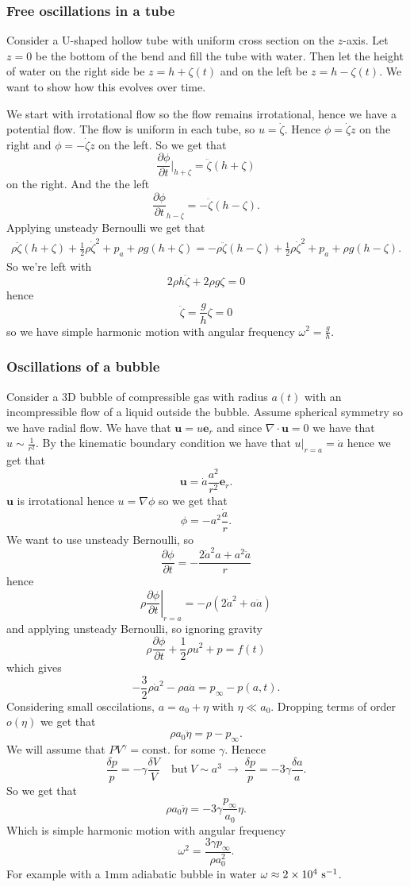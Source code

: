 \documentclass{article}
\begin{document}
\subsubsection{Free oscillations in a tube}
Consider a U-shaped hollow tube with uniform cross section on the $ z $-axis. Let $ z=0 $ be the bottom of the bend and fill the tube with water. Then let the height of water on the right side be $ z = h+\zeta(t) $ and on the left be $ z=h-\zeta(t) $. We want to show how this evolves over time.\par
We start with irrotational flow so the flow remains irrotational, hence we have a potential flow. The flow is uniform in each tube, so $ u = \dot\zeta $. Hence $ \phi= \dot \zeta z $ on the right and $ \phi = -\dot\zeta z $ on the left. So we get that
\[
	\frac{\partial \phi}{\partial t}|_{h+\zeta} = \ddot \zeta(h + \zeta)
\]
on the right. And the the left
\[
	\frac{\partial \phi}{\partial t}_{h-\zeta} = - \ddot \zeta(h-\zeta).
\]
Applying unsteady Bernoulli we get that
\begin{align*}
	\rho \ddot \zeta(h+\zeta) + \frac 12 \rho \dot{\zeta}^2 + p_a+\rho g(h+\zeta) = -\rho \ddot\zeta(h-\zeta) + \frac 12 \rho \dot\zeta^2 + p_a + \rho g(h-\zeta). 
\end{align*}
So we're left with
\[
  2\rho h \ddot \zeta + 2 \rho g \zeta = 0
\]
hence
\[
  \ddot \zeta = \frac gh \zeta = 0
\]
so we have simple harmonic motion with angular frequency $ \omega^2 = \frac gh $.
\subsubsection{Oscillations of a bubble}
Consider a 3D bubble of compressible gas with radius $ a(t) $ with an incompressible flow of a liquid outside the bubble. Assume spherical symmetry so we have radial flow. We have that $ \mathbf u = u\mathbf e_r $ and since $ \nabla\cdot \mathbf u = 0 $ we have that $ u\sim \frac 1{r^2} $. By the kinematic boundary condition we have that $ u|_{r=a} = \dot a $ hence we get that
\[
	\mathbf u = \dot a \frac{a^2}{r^2}\mathbf e_r.
\]
$ \mathbf u $ is irrotational hence $ u=\nabla\phi $ so we get that
\[
	\phi = - a^2\frac{\dot a}r.
\]
We want to use unsteady Bernoulli, so
\[
	\frac{\partial \phi}{\partial t} = - \frac{2\dot a^2a + a^2\ddot a}r
\]
hence
\[
	\left.\rho\frac{\partial\phi}{\partial t}\right|_{r=a} = -\rho(2\dot a^2+a\ddot a)
\]
and applying unsteady Bernoulli, so ignoring gravity
\[
	\rho \frac{\partial \phi}{\partial t} + \frac 12 \rho u^2 + p = f(t)
\]
which gives
\[
  -\frac 32 \rho \dot a^2 - \rho a\ddot a =p_\infty - p(a,t).
\]
Considering small osccilations, $ a = a_0 + \eta $ with $ \eta \ll a_0 $. Dropping terms of order $ o(\eta) $ we get that
\[
  \rho a_0\ddot \eta = p-p_\infty.
\]
We will assume that $ PV^\gamma=\text{const.} $ for some $ \gamma $. Henece 
\[
	\frac{\delta p}p = -\gamma\frac{\delta V}V\quad \text{but}\ V\sim a^3\ \longrightarrow \ \frac{\delta p}p = -3\gamma \frac{\delta a}a.
\]
So we get that
\[
	\rho a_0 \ddot \eta = - 3\gamma \frac{p_\infty}{a_0}\eta.
\]
Which is simple harmonic motion with angular frequency
\[
	\omega^2 = \frac{3\gamma p_\infty}{\rho a_0^2}.
\]
For example with a $ 1 $mm adiabatic bubble in water $ \omega\approx 2\times 10^4\ {\mathrm{s}}^{-1} $.
\end{document}
